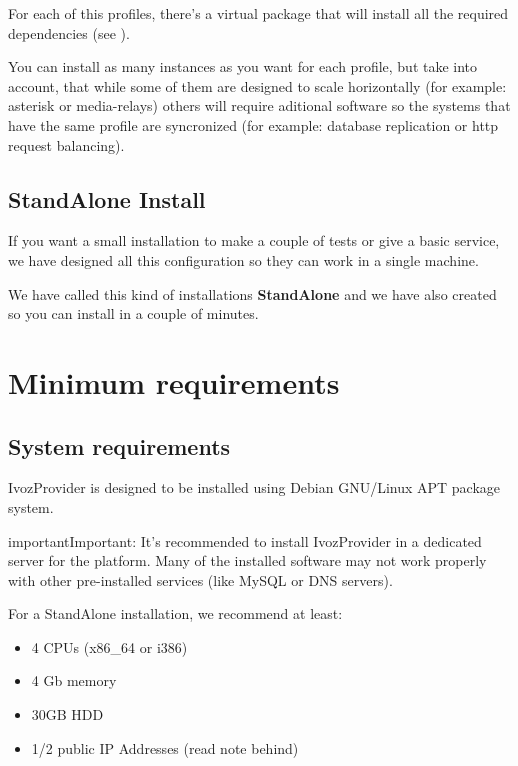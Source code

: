 \documentclass[letterpaper,10pt,english]{sphinxmanual}
\begin{document}
For each of this profiles, there's a virtual package that will install all the
required dependencies (see {\hyperref[installation/debian_install:installing\string-profile\string-package]{}}).

You can install as many instances as you want for each profile, but take into
account, that while some of them are designed to scale horizontally (for
example: asterisk or media-relays) others will require aditional software so the
systems that have the same profile are syncronized (for example: database
replication or http request balancing).


\subsection{StandAlone Install}
\label{installation/install_types:standalone-install}
If you want a small installation to make a couple of tests or give a basic
service, we have designed all this configuration so they can work in a single
machine.

We have called this kind of installations \textbf{StandAlone} and we have also
created {\hyperref[installation/cd_install:automatic\string-iso\string-cd\string-image]{}} so you can install in a couple of minutes.


\section{Minimum requirements}
\label{installation/requirements:minimum-requirements}\label{installation/requirements::doc}

\subsection{System requirements}
\label{installation/requirements:system-requirements}
IvozProvider is designed to be installed using Debian GNU/Linux APT package
system.

\begin{notice}{important}{Important:}
It's recommended to install IvozProvider in a dedicated server
for the platform. Many of the installed software may not work properly with
other pre-installed services (like MySQL or DNS servers).
\end{notice}

For a StandAlone installation, we recommend at least:
\begin{itemize}
\item {} 
4 CPUs (x86\_64 or i386)

\item {} 
4 Gb memory

\item {} 
30GB HDD

\item {} 
1/2 public IP Addresses (read note behind)

\end{itemize}
\end{document}
